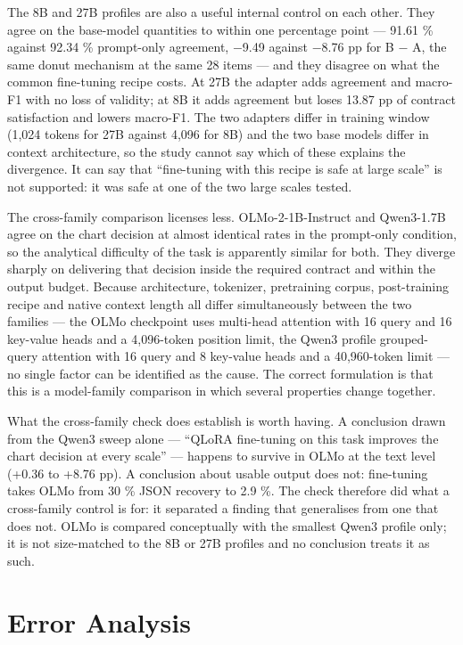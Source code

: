 The 8B and 27B profiles are also a useful internal control on each other. They agree on the base-model quantities to within one percentage point --- 91.61 \% against 92.34 \% prompt-only agreement, \ensuremath{-}9.49 against \ensuremath{-}8.76 pp for B \ensuremath{-} A, the same donut mechanism at the same 28 items --- and they disagree on what the common fine-tuning recipe costs. At 27B the adapter adds agreement and macro-F1 with no loss of validity; at 8B it adds agreement but loses 13.87 pp of contract satisfaction and lowers macro-F1. The two adapters differ in training window (1,024 tokens for 27B against 4,096 for 8B) and the two base models differ in context architecture, so the study cannot say which of these explains the divergence. It can say that ``fine-tuning with this recipe is safe at large scale'' is not supported: it was safe at one of the two large scales tested.

The cross-family comparison licenses less. OLMo-2-1B-Instruct and Qwen3-1.7B agree on the chart decision at almost identical rates in the prompt-only condition, so the analytical difficulty of the task is apparently similar for both. They diverge sharply on delivering that decision inside the required contract and within the output budget. Because architecture, tokenizer, pretraining corpus, post-training recipe and native context length all differ simultaneously between the two families --- the OLMo checkpoint uses multi-head attention with 16 query and 16 key-value heads and a 4,096-token position limit, the Qwen3 profile grouped-query attention with 16 query and 8 key-value heads and a 40,960-token limit --- no single factor can be identified as the cause. The correct formulation is that this is a model-family comparison in which several properties change together.

What the cross-family check does establish is worth having. A conclusion drawn from the Qwen3 sweep alone --- ``QLoRA fine-tuning on this task improves the chart decision at every scale'' --- happens to survive in OLMo at the text level (+0.36 to +8.76 pp). A conclusion about usable output does not: fine-tuning takes OLMo from 30 \% JSON recovery to 2.9 \%. The check therefore did what a cross-family control is for: it separated a finding that generalises from one that does not. OLMo is compared conceptually with the smallest Qwen3 profile only; it is not size-matched to the 8B or 27B profiles and no conclusion treats it as such.

\section{Error Analysis}


